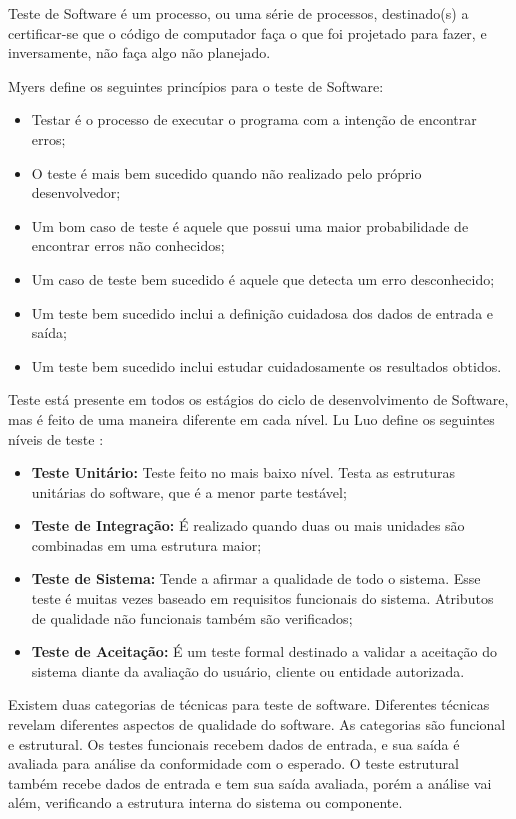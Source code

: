Teste de Software é um processo, ou uma série de processos, destinado(s) a certificar-se que o código de computador faça o que foi projetado para fazer, e inversamente, não faça algo não planejado\cite{myers2011}.

Myers define os seguintes princípios para o teste de Software\cite{myers2011}:

\begin{itemize}
  \item Testar é o processo de executar o programa com a intenção de encontrar erros;
  \item O teste é mais bem sucedido quando não realizado pelo próprio desenvolvedor;
  \item Um bom caso de teste é aquele que possui uma maior probabilidade de encontrar erros não conhecidos;
  \item Um caso de teste bem sucedido é aquele que detecta um erro desconhecido;
  \item Um teste bem sucedido inclui a definição cuidadosa dos dados de entrada e saída;
  \item Um teste bem sucedido inclui estudar cuidadosamente os resultados obtidos.
\end{itemize}

Teste está presente em todos os estágios do ciclo de desenvolvimento de Software, mas é feito de uma maneira diferente em cada nível. Lu Luo define os seguintes níveis de teste \cite{luo2001}:

\begin{itemize}
  \item \textbf{Teste Unitário:} Teste feito no mais baixo nível. Testa as estruturas unitárias do software, que é a menor parte testável;
  \item \textbf{Teste de Integração:} É realizado quando duas ou mais unidades são combinadas em uma estrutura maior;
  \item \textbf{Teste de Sistema:} Tende a afirmar a qualidade de todo o sistema. Esse teste é muitas vezes baseado em requisitos funcionais do sistema. Atributos de qualidade não funcionais também são verificados;
  \item \textbf{Teste de Aceitação:} É um teste formal destinado a validar a aceitação do sistema diante da avaliação do usuário, cliente ou entidade autorizada.
\end{itemize}

Existem duas categorias de técnicas para teste de software. Diferentes técnicas revelam diferentes aspectos de qualidade do software. As categorias são funcional e estrutural. Os testes funcionais recebem dados de entrada, e sua saída é avaliada para análise da conformidade com o esperado. O teste estrutural também recebe dados de entrada e tem sua saída avaliada, porém a análise vai além, verificando a estrutura interna do sistema ou componente\cite{luo2001}.

